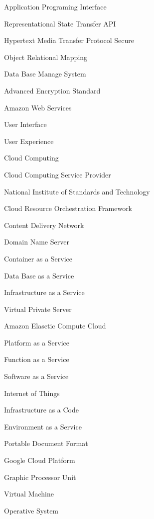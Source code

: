     {Application Programing Interface}

    {\gls{Representational State Transfer API}}

    {\gls{Hypertext Media Transfer Protocol Secure}}

    {Object Relational Mapping}

    {\gls{Data Base Manage System}}

    {Advanced Encryption Standard}
 
    {\gls{Amazon Web Services}}
  
    {\gls{User Interface}}

    {User Experience}

    {\gls{Cloud Computing}}

    {\gls{Cloud Computing Service Provider}}

    {National Institute of Standards and Technology}

    {Cloud Resource Orchestration Framework}

    {Content Delivery Network}

    {Domain Name Server}

    {Container as a Service}

    {Data Base as a Service}

    {Infrastructure as a Service}

    {Virtual Private Server}

    {Amazon Elasctic Compute Cloud}

    {Platform as a Service}

    {Function as a Service}

    {Software as a Service}

    {Internet of Things}

    {Infrastructure as a Code}

    {Environment as a Service}

    {Portable Document Format}

    {Google Cloud Platform}

    {Graphic Processor Unit}

    {Virtual Machine}

    {Operative System}

